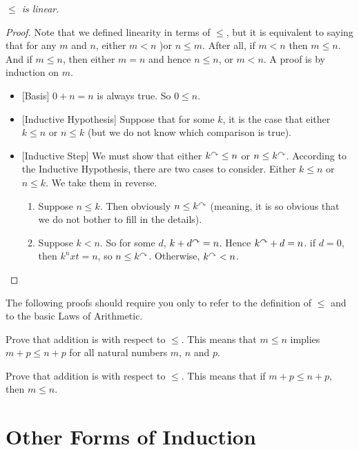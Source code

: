 \begin{lem}
  \emph{$\leq$ is linear.}

  \begin{proof}
  	Note that we defined linearity in terms of $\leq$, but it is equivalent to saying that for any $m$ and $n$, either $m<n$ )or $n\leq m$. After all, if $m<n$ then $m\leq n$. And if $m\leq n$, then either $m=n$ and hence $n\leq n$, or $m<n$.  
    A proof is by induction on $m$.
    \begin{itemize}
    \item{}[Basis] $0 + n = n$ is always true. So $0\leq n$.
    \item{}[Inductive Hypothesis] Suppose that for some $k$, it
      is the case that either
      $k\leq n$ or $n\leq k$ (but we do not know which comparison is true).
    \item{}[Inductive Step] We must show that either $k^\curvearrowright \leq n$ or
      $n\leq k^\curvearrowright$.  According to the Inductive Hypothesis, there
      are two cases to consider. Either $k\leq n$ or $n\leq k$. We take them in reverse.
      \begin{enumerate}
      	\item Suppose $n\leq k$. 
	      	Then obviously $n\leq k^\curvearrowright$ (meaning, it is so obvious that we do not bother to fill in the details).
		    \item Suppose $k< n$. So for some $d$, $k+d^\curvearrowright =n$. Hence $k^\curvearrowright+d=n$. if $d=0$, then $k^nxt = n$, so $n\leq k^\curvearrowright$. Otherwise, $k^\curvearrowright < n$.
      \end{enumerate}
    \end{itemize}
  \end{proof}
\end{lem}

\begin{exer}
	The following proofs should require you only to refer to the definition of $\leq$ and to the basic Laws of Arithmetic.
	\begin{exercise}
		\item Prove that addition is  with respect to $\leq$. This means that $m\leq n$ implies $m+p\leq n+p$ for all natural numbers $m$, $n$ and $p$.
		\item Prove that addition is  with respect to $\leq$. This means that if $m+p\leq n+p$, then $m\leq n$.
	\end{exercise}
\end{exer}

\section{Other Forms of Induction}

